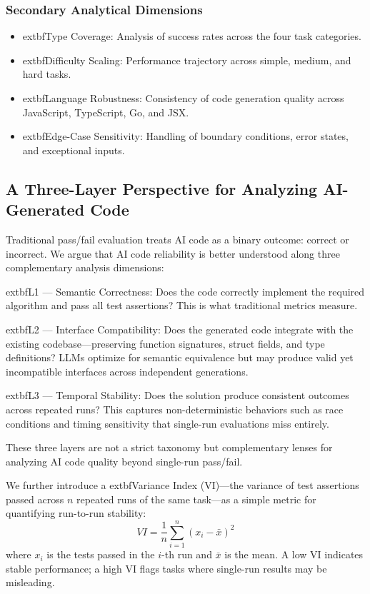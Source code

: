 \documentclass[conference]{IEEEtran}
\begin{document}
\subsubsection{Secondary Analytical Dimensions}
\begin{itemize}[leftmargin=*]
 \item 			extbf{Type Coverage:} Analysis of success rates across the four task categories.
 \item 			extbf{Difficulty Scaling:} Performance trajectory across simple, medium, and hard tasks.
 \item 			extbf{Language Robustness:} Consistency of code generation quality across JavaScript, TypeScript, Go, and JSX.
 \item 			extbf{Edge-Case Sensitivity:} Handling of boundary conditions, error states, and exceptional inputs.
\end{itemize}

\subsection{A Three-Layer Perspective for Analyzing AI-Generated Code}
\label{sec:three_layer}

Traditional pass/fail evaluation treats AI code as a binary outcome: correct or incorrect.
We argue that AI code reliability is better understood along three complementary analysis dimensions:

	extbf{L1 --- Semantic Correctness:} Does the code correctly implement the required algorithm and pass all test assertions? This is what traditional metrics measure.

	extbf{L2 --- Interface Compatibility:} Does the generated code integrate with the existing codebase---preserving function signatures, struct fields, and type definitions? LLMs optimize for semantic equivalence but may produce valid yet incompatible interfaces across independent generations.

	extbf{L3 --- Temporal Stability:} Does the solution produce consistent outcomes across repeated runs? This captures non-deterministic behaviors such as race conditions and timing sensitivity that single-run evaluations miss entirely.

These three layers are not a strict taxonomy but complementary lenses for analyzing AI code quality beyond single-run pass/fail.

We further introduce a 	extbf{Variance Index (VI)}---the variance of test assertions passed across $n$ repeated runs of the same task---as a simple metric for quantifying run-to-run stability:
\[VI = \frac{1}{n}\sum_{i=1}^{n}(x_i - \bar{x})^2\]
where $x_i$ is the tests passed in the $i$-th run and $\bar{x}$ is the mean. A low VI indicates stable performance; a high VI flags tasks where single-run results may be misleading.
\end{document}
